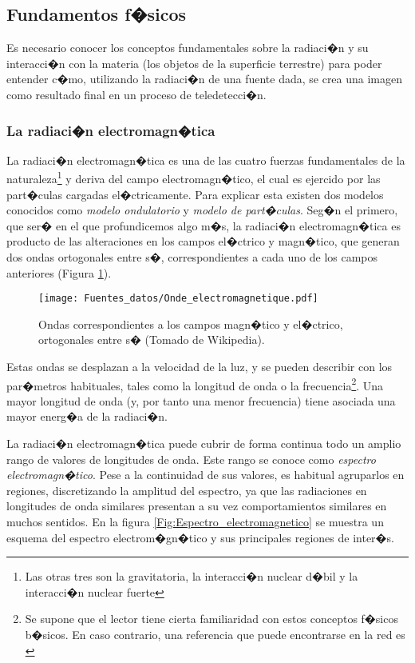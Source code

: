 \subsection{Fundamentos f�sicos}

Es necesario conocer los conceptos fundamentales sobre la radiaci�n y su interacci�n con la materia (los objetos de la superficie terrestre) para poder entender c�mo, utilizando la radiaci�n de una fuente dada, se crea una imagen como resultado final en un proceso de teledetecci�n.

\subsubsection{La radiaci�n electromagn�tica}

La radiaci�n electromagn�tica es una de las cuatro fuerzas fundamentales de la naturaleza\footnote{Las otras tres son la gravitatoria, la interacci�n nuclear d�bil y la interacci�n nuclear fuerte} y deriva del campo electromagn�tico, el cual es ejercido por las part�culas cargadas el�ctricamente. Para explicar esta existen dos modelos conocidos como \emph{modelo ondulatorio} y \emph{modelo de part�culas}. Seg�n el primero, que ser� en el que profundicemos algo m�s, la radiaci�n electromagn�tica es producto de las alteraciones en los campos el�ctrico y magn�tico, que generan dos ondas ortogonales entre s�, correspondientes a cada uno de los campos anteriores (Figura \ref{Fig:Radiacion_electromagnetica}).

\begin{figure}[!hbt]   
\centering
\texttt{[image: Fuentes\_datos/Onde\_electromagnetique.pdf]}
\caption{\small Ondas correspondientes a los campos magn�tico y el�ctrico, ortogonales entre s� (Tomado de Wikipedia). }
\label{Fig:Radiacion_electromagnetica} 
\end{figure}

Estas ondas se desplazan a la velocidad de la luz, y se pueden describir con los par�metros habituales, tales como la longitud de onda o la frecuencia\footnote{Se supone que el lector tiene cierta familiaridad con estos conceptos f�sicos b�sicos. En caso contrario, una referencia que puede encontrarse en la red es \cite{webbookOndas}}. Una mayor longitud de onda (y, por tanto una menor frecuencia) tiene asociada una mayor energ�a de la radiaci�n.

La radiaci�n electromagn�tica puede cubrir de forma continua todo un amplio rango de valores de longitudes de onda. Este rango se conoce como \emph{espectro electromagn�tico}. Pese a la continuidad de sus valores, es habitual agruparlos en regiones, discretizando la amplitud del espectro, ya que las radiaciones en longitudes de onda similares presentan a su vez comportamientos similares en muchos sentidos. En la figura \ref{Fig:Espectro_electromagnetico} se muestra un esquema del espectro electrom�gn�tico y sus principales regiones de inter�s.

